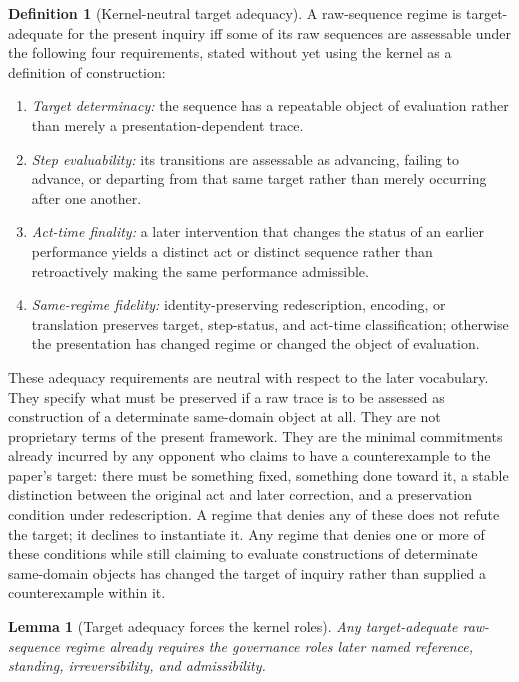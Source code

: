 \documentclass[11pt]{article}
\newtheorem{lemma}[theorem]{Lemma}
\theoremstyle{definition}
\newtheorem{definition}[theorem]{Definition}
\theoremstyle{remark}
\begin{document}
\begin{definition}[Kernel-neutral target adequacy]\label{def:target-adequacy}
A raw-sequence regime is target-adequate for the present inquiry iff some of its raw sequences are assessable under the following four requirements, stated without yet using the kernel as a definition of construction:
\begin{enumerate}[label=(A\arabic*)]
\item \emph{Target determinacy:} the sequence has a repeatable object of evaluation rather than merely a presentation-dependent trace.
\item \emph{Step evaluability:} its transitions are assessable as advancing, failing to advance, or departing from that same target rather than merely occurring after one another.
\item \emph{Act-time finality:} a later intervention that changes the status of an earlier performance yields a distinct act or distinct sequence rather than retroactively making the same performance admissible.
\item \emph{Same-regime fidelity:} identity-preserving redescription, encoding, or translation preserves target, step-status, and act-time classification; otherwise the presentation has changed regime or changed the object of evaluation.
\end{enumerate}
These adequacy requirements are neutral with respect to the later vocabulary. They specify what must be preserved if a raw trace is to be assessed as construction of a determinate same-domain object at all. They are not proprietary terms of the present framework. They are the minimal commitments already incurred by any opponent who claims to have a counterexample to the paper's target: there must be something fixed, something done toward it, a stable distinction between the original act and later correction, and a preservation condition under redescription. A regime that denies any of these does not refute the target; it declines to instantiate it. Any regime that denies one or more of these conditions while still claiming to evaluate constructions of determinate same-domain objects has changed the target of inquiry rather than supplied a counterexample within it.
\end{definition}

\begin{lemma}[Target adequacy forces the kernel roles]\label{lem:target-adequacy-forces-kernel}
Any target-adequate raw-sequence regime already requires the governance roles later named reference, standing, irreversibility, and admissibility.
\end{lemma}
\end{document}
